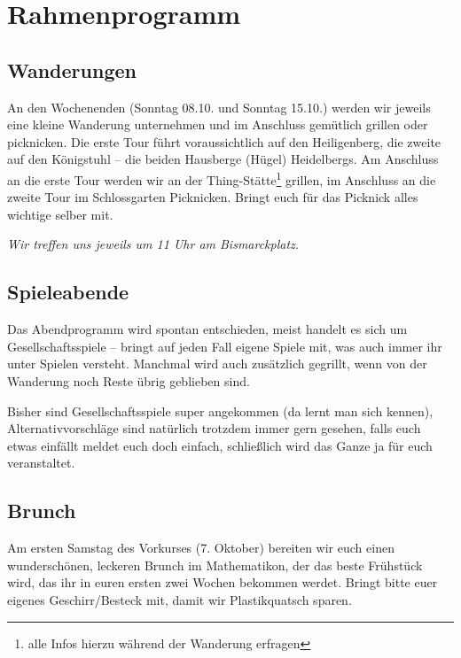 \section{Rahmenprogramm}
\subsection{Wanderungen}
An den Wochenenden (Sonntag 08.10. und Sonntag 15.10.) werden wir jeweils eine kleine Wanderung unternehmen und im Anschluss gemütlich grillen oder picknicken. Die erste Tour führt voraussichtlich auf den Heiligenberg, die zweite auf den Königstuhl -- die beiden Hausberge (Hügel) Heidelbergs. Am Anschluss an die erste Tour werden wir an der Thing-Stätte\footnote{alle Infos hierzu während der Wanderung erfragen} grillen, im Anschluss an die zweite Tour im Schlossgarten Picknicken. Bringt euch für das Picknick alles wichtige selber mit.

\noindent\emph{Wir treffen uns jeweils um 11 Uhr am Bismarckplatz.}

\subsection{Spieleabende}
Das Abendprogramm wird spontan entschieden, meist handelt es sich um Gesellschaftsspiele -- bringt auf jeden Fall eigene Spiele mit, was auch immer ihr unter Spielen versteht. Manchmal wird auch zusätzlich gegrillt, wenn von der Wanderung noch Reste übrig geblieben sind.

Bisher sind Gesellschaftsspiele super angekommen (da lernt man sich kennen), Alternativvorschläge sind natürlich trotzdem immer gern gesehen, falls euch etwas einfällt meldet euch doch einfach, schließlich wird das Ganze ja für euch veranstaltet.

\subsection{Brunch}
Am ersten Samstag des Vorkurses (7. Oktober) bereiten wir euch einen wunderschönen, leckeren Brunch im \gls{Mathematikon}, der das beste Frühstück wird, das ihr in euren ersten zwei Wochen bekommen werdet. Bringt bitte euer eigenes Geschirr/Besteck mit, damit wir Plastikquatsch sparen.


